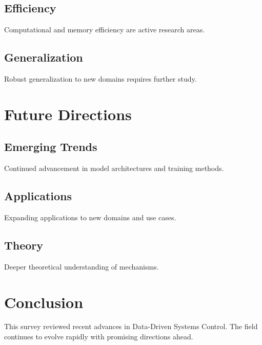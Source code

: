 \documentclass[11pt,a4paper]{article}
\begin{document}
\subsection{Efficiency}

Computational and memory efficiency are active research areas.

\subsection{Generalization}

Robust generalization to new domains requires further study.



\section{Future Directions}

\subsection{Emerging Trends}

Continued advancement in model architectures and training methods.

\subsection{Applications}

Expanding applications to new domains and use cases.

\subsection{Theory}

Deeper theoretical understanding of mechanisms.



\section{Conclusion}

This survey reviewed recent advances in Data-Driven Systems Control. The field continues to evolve rapidly with promising directions ahead.
\end{document}
